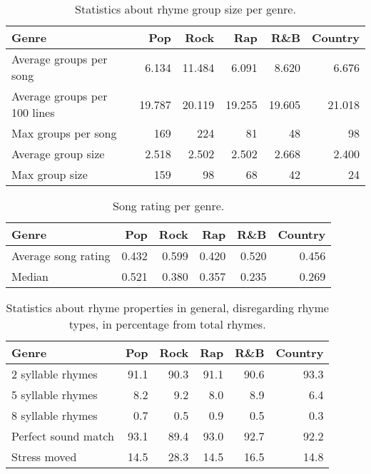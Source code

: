 \begin{table}[h!]
	\centering
	\begin{tabular}{l | r r r r r} 	
		Genre & 			Pop & 		Rock & 		Rap & 		R\&B & 		Country\\ 
		\midrule
		Average groups per song& 6.134 &11.484 &6.091 &8.620 &6.676  \\
		Average groups per 100 lines &19.787 &20.119 &19.255 &19.605 &21.018 \\
		Max groups per song & 169 &224 & 81 & 48 &98\\
		Average group size & 2.518 &2.502 &2.502 &2.668 &2.400 \\
		Max group size & 159 &98 & 68 & 42 & 24\\
	\end{tabular}
	\caption{Statistics about rhyme group size per genre.} 
	\label{rhyme_group_size}
\end{table}

\begin{table}[h!]
	\centering
	\begin{tabular}{l | r r r r r} 	
		Genre & 			Pop & 		Rock & 		Rap & 		R\&B & 		Country\\ 
		\midrule
		Average song rating& 0.432 & 0.599 &0.420 &0.520 &0.456  \\
		Median & 0.521 & 0.380 &0.357 &0.235 & 0.269\\
	\end{tabular}
	\caption{Song rating per genre.} 
	\label{song_rating_stats}
\end{table}

\begin{table}[h!]
	\centering
	\begin{tabular}{l | r r r r r} 	
		Genre & 			Pop & 		Rock & 		Rap & 		R\&B & 		Country\\ 
		\midrule
		 2 syllable rhymes & 91.1& 90.3& 91.1& 90.6 & 93.3\\
		5 syllable rhymes& 8.2& 9.2& 8.0& 8.9& 6.4  \\
		 8 syllable rhymes& 0.7& 0.5& 0.9& 0.5& 0.3 \\
		 Perfect sound match & 93.1& 89.4& 93.0& 92.7& 92.2  \\
		 Stress moved & 14.5& 28.3& 14.5& 16.5& 14.8 \\

	\end{tabular}
	\caption{Statistics about rhyme properties in general, disregarding rhyme types, in percentage from total rhymes.} 
	\label{song_rating_stats}
\end{table}